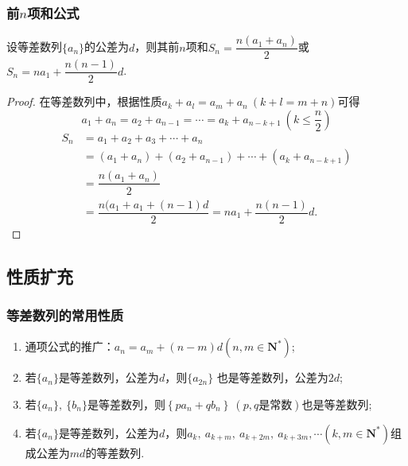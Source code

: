 \documentclass{BHCexam}
\begin{document}
\subsubsection{前$ n $项和公式}
设等差数列$\{a_n\}$的公差为$ d $，则其前$ n $项和$ S_n=\dfrac{n\left(a_1+a_n\right)}{2} $或$ S_n=na_1+\dfrac{n(n-1)}{2}d $.
\begin{proof}
在等差数列中，根据性质$ a_k+a_l=a_m+a_n~(k+l=m+n) $可得$$ a_1+a_n=a_2+a_{n-1}=\cdots=a_k+a_{n-k+1} ~\left(k\le\dfrac{n}{2}\right)$$
\begin{equation*}
\begin{aligned}
S_n&=a_1+a_2+a_3+\cdots+a_n\\
 &=\left(a_1+a_n\right)+\left(a_2+a_{n-1}\right)+\cdots+\left(a_k+a_{n-k+1}\right)\\
&=\dfrac{n(a_1+a_n)}{2}\\
&=\dfrac{n(a_1+a_1+(n-1)d}{2}=na_1+\dfrac{n(n-1)}{2}d.
\end{aligned}
\end{equation*}
\end{proof}
\subsection{性质扩充}
\subsubsection{等差数列的常用性质}
\begin{enumerate}[(1)]
\item 通项公式的推广：$ a_n=a_m+\left(n-m\right)d \left(n,m\in\mathbf{N^*}\right)$;
\item 若$\{a_n\}$是等差数列，公差为$ d $，则$\{a_{2n}\}$ 也是等差数列，公差为$ 2d $;
\item 若$\{a_n\},~\{b_n\}$是等差数列，则$ \left\{pa_n+qb_n\right\}~(p,q\text{是常数}) $也是等差数列;
\item 若$\{a_n\}$是等差数列，公差为$ d $，则$ a_k,~a_{k+m},~ a_{k+2m},~a_{k+3m},\cdots\left(k,m\in\mathbf{N^*}\right)$组成公差为$ md $的等差数列.
\end{enumerate}
\end{document}
